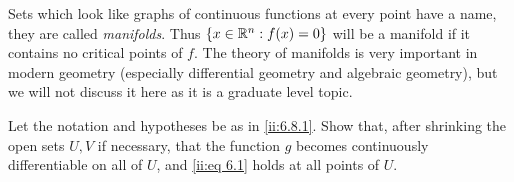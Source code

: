 \begin{rmk}\label{ii:6.8.4}
  Sets which look like graphs of continuous functions at every point have a name, they are called \emph{manifolds}.
  Thus \(\left\lbrace x \in \mathbb{R}^n : f(x) = 0\right\rbrace\) will be a manifold if it contains no critical points of \(f\).
  The theory of manifolds is very important in modern geometry (especially differential geometry and algebraic geometry), but we will not discuss it here as it is a graduate level topic.
\end{rmk}

\exercisesection

\begin{ex}\label{ii:ex:6.8.1}
  Let the notation and hypotheses be as in \cref{ii:6.8.1}.
  Show that, after shrinking the open sets \(U, V\) if necessary, that the function \(g\) becomes continuously differentiable on all of \(U\), and \cref{ii:eq 6.1} holds at all points of \(U\).
\end{ex}
